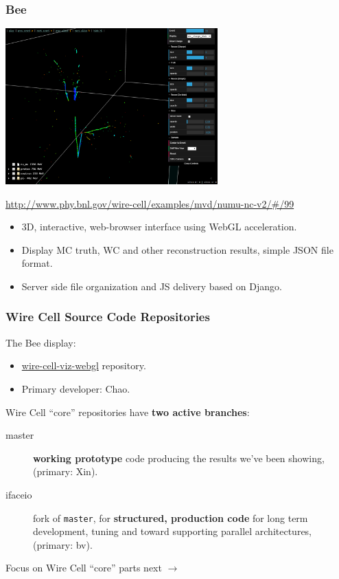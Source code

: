 \documentclass[xcolor=dvipsnames]{beamer}
\begin{document}
\begin{frame}[fragile]
  \frametitle{Bee}

  \scriptsize
  \begin{center}
    \vspace{-0.5cm}

    \includegraphics[height=6cm]{bee.png}    

    \url{http://www.phy.bnl.gov/wire-cell/examples/mvd/numu-nc-v2/#/99}
  \end{center}

  \begin{itemize}
  \item 3D, interactive, web-browser interface using WebGL acceleration.
  \item Display MC truth, WC and other reconstruction results,
    simple JSON file format.
  \item Server side file organization and JS delivery based on Django.
  \end{itemize}

\end{frame}

\begin{frame}
  \frametitle{Wire Cell Source Code Repositories} 
  \footnotesize

  The Bee display:
  \begin{itemize}
  \item \href{https://github.com/BNLIF/wire-cell-viz-webgl}{wire-cell-viz-webgl}
    repository.
  \item Primary developer: Chao.
  \end{itemize}

  \vspace{5mm}

  Wire Cell ``core'' repositories have \textbf{two active branches}:
  \begin{description}
  \item[master] \textbf{working prototype} code producing the results we've
    been showing, (primary: Xin).
  \item[ifaceio] fork of \texttt{master}, for \textbf{structured,
      production code} for long term development, tuning and toward
    supporting parallel architectures, (primary: bv).
  \end{description}

  \vspace{10mm}
  \scriptsize
  \flushright Focus on Wire Cell ``core'' parts next $\rightarrow$
\end{frame}
\end{document}
